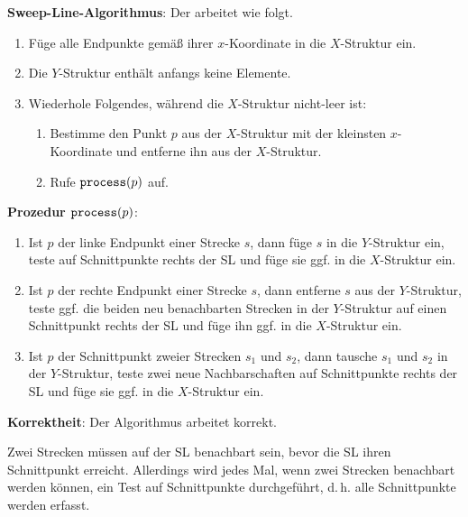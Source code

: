\textbf{Sweep-Line-Algorithmus}:
Der  arbeitet wie folgt.
\begin{enumerate}
    \item
    Füge alle Endpunkte gemäß ihrer $x$-Koordinate in die $X$-Struktur ein.

    \item
    Die $Y$-Struktur enthält anfangs keine Elemente.

    \item
    Wiederhole Folgendes, während die $X$-Struktur nicht-leer ist:
    \begin{enumerate}
        \item
        Bestimme den Punkt $p$ aus der $X$-Struktur mit der kleinsten $x$-Koordinate und
        entferne ihn aus der $X$-Struktur.

        \item
        Rufe $\texttt{process}(p)$ auf.
    \end{enumerate}
\end{enumerate}

\linie
\pagebreak

\textbf{Prozedur $\texttt{process}(p)$}:
\begin{enumerate}
    \item
    Ist $p$ der linke Endpunkt einer Strecke $s$, dann füge $s$ in die $Y$-Struktur ein,
    teste auf Schnittpunkte rechts der SL und füge sie ggf. in die $X$-Struktur ein.

    \item
    Ist $p$ der rechte Endpunkt einer Strecke $s$, dann entferne $s$ aus der $Y$-Struktur,
    teste ggf.
    die beiden neu benachbarten Strecken in der $Y$-Struktur auf einen Schnittpunkt rechts der SL
    und füge ihn ggf. in die $X$-Struktur ein.

    \item
    Ist $p$ der Schnittpunkt zweier Strecken $s_1$ und $s_2$, dann tausche $s_1$ und $s_2$ in
    der $Y$-Struktur, teste zwei neue Nachbarschaften auf Schnittpunkte rechts der SL und
    füge sie ggf. in die $X$-Struktur ein.
\end{enumerate}

\linie

\textbf{Korrektheit}:
Der Algorithmus arbeitet korrekt.

\begin{Beweis}
    Zwei Strecken müssen auf der SL benachbart sein,
    bevor die SL ihren Schnittpunkt erreicht.
    Allerdings wird jedes Mal, wenn zwei Strecken benachbart werden können, ein Test auf
    Schnittpunkte durchgeführt, d.\,h. alle Schnittpunkte werden erfasst.
\end{Beweis}

